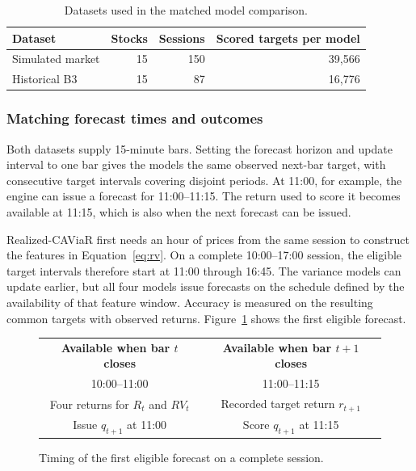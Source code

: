 \documentclass[
	12pt,				%
	openright,			%
	twoside,			%
	a4paper,
	chapter=TITLE,
	english				%
	]{abntex2}
\begin{document}
\begin{table}[htbp]
\centering
\caption{Datasets used in the matched model comparison.}
\label{tab:data}
\begin{tabular}{lrrr}
\toprule
Dataset & Stocks & Sessions & Scored targets per model \\
\midrule
Simulated market & 15 & 150 & 39,566 \\
Historical B3 & 15 & 87 & 16,776 \\
\bottomrule
\end{tabular}
\end{table}

\subsubsection{Matching forecast times and outcomes}

Both datasets supply 15-minute bars. Setting the forecast horizon and update interval to one bar gives the models the same observed next-bar target, with consecutive target intervals covering disjoint periods. At 11:00, for example, the engine can issue a forecast for 11:00--11:15. The return used to score it becomes available at 11:15, which is also when the next forecast can be issued.

Realized-CAViaR first needs an hour of prices from the same session to construct the features in Equation~\ref{eq:rv}. On a complete 10:00--17:00 session, the eligible target intervals therefore start at 11:00 through 16:45. The variance models can update earlier, but all four models issue forecasts on the schedule defined by the availability of that feature window. Accuracy is measured on the resulting common targets with observed returns. Figure~\ref{fig:timeline} shows the first eligible forecast.

\begin{figure}[htbp]
\centering
\caption{Timing of the first eligible forecast on a complete session.}
\label{fig:timeline}
\begin{tabular}{@{}c|c@{}}
\textbf{Available when bar $t$ closes} & \textbf{Available when bar $t+1$ closes} \\[4pt]
10:00--11:00 & 11:00--11:15 \\
Four returns for $R_t$ and $RV_t$ & Recorded target return $r_{t+1}$ \\[4pt]
Issue $q_{t+1}$ at 11:00 & Score $q_{t+1}$ at 11:15
\end{tabular}
\end{figure}
\end{document}
